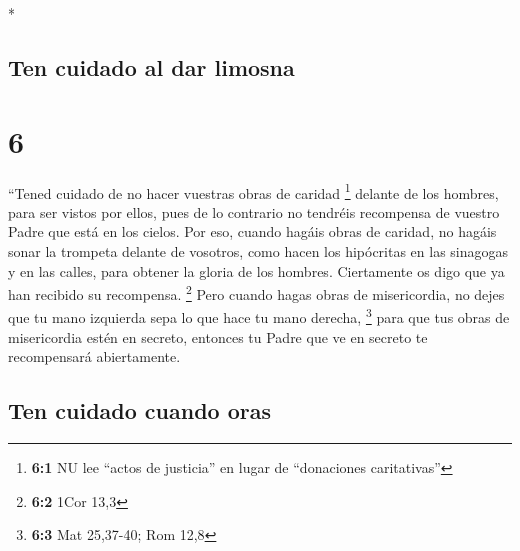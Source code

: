 \begin{paracol}{2}
\begin{otherlanguage}{english}
\end{otherlanguage}

\switchcolumn[0]*

\hypertarget{ten-cuidado-al-dar-limosna}{%
\subsection{Ten cuidado al dar
limosna}\label{ten-cuidado-al-dar-limosna}}

\hypertarget{section-10}{%
\section{6}\label{section-10}}

 ``Tened cuidado de no hacer vuestras obras de caridad
\footnote{\textbf{6:1} NU lee ``actos de justicia'' en lugar de
  ``donaciones caritativas''} delante de los hombres, para ser vistos
por ellos, pues de lo contrario no tendréis recompensa de vuestro Padre
que está en los cielos.  Por eso, cuando hagáis obras de
caridad, no hagáis sonar la trompeta delante de vosotros, como hacen los
hipócritas en las sinagogas y en las calles, para obtener la gloria de
los hombres. Ciertamente os digo que ya han recibido su recompensa.
\footnote{\textbf{6:2} 1Cor 13,3}  Pero cuando hagas obras
de misericordia, no dejes que tu mano izquierda sepa lo que hace tu mano
derecha, \footnote{\textbf{6:3} Mat 25,37-40; Rom 12,8} 
para que tus obras de misericordia estén en secreto, entonces tu Padre
que ve en secreto te recompensará abiertamente.

\hypertarget{ten-cuidado-cuando-oras}{%
\subsection{Ten cuidado cuando oras}\label{ten-cuidado-cuando-oras}}


\end{paracol}
